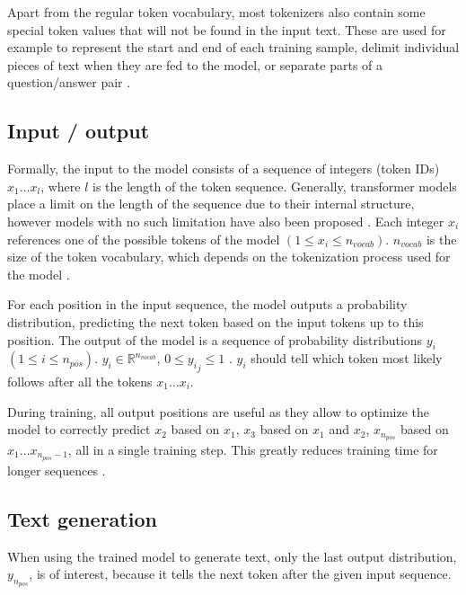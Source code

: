 Apart from the regular token vocabulary, most tokenizers also contain some special token values that will not be found in the input text. These are used for example to represent the start and end of each training sample, delimit individual pieces of text when they are fed to the model, or separate parts of a question/answer pair \cite{HuggingFaceTokenizers}.


\subsection{Input / output}

Formally, the input to the model consists of a sequence of integers (token IDs) $x_1 \ldots x_l$, where $l$ is the length of the token sequence.
Generally, transformer models place a limit on the length of the sequence due to their internal structure, however models with no such limitation have also been proposed \cite{su2023roformer}.
Each integer $x_i$ references one of the possible tokens of the model $(1 \leq x_i \leq n_{vocab})$. $n_{vocab}$ is the size of the token vocabulary, which depends on the tokenization process used for the model .

\label{transformer:output}

For each position in the input sequence, the model outputs a probability distribution, predicting the next token based on the input tokens up to this position. 
The output of the model is a sequence of probability distributions $y_i$ $(1 \leq i \leq n_{pos})$. $y_i \in \mathbb{R}^{n_{vocab}}$, $0 \leq {y_i}_j \leq 1$  \cite{HuggingFaceGPT2}.
$y_i$ should tell which token most likely follows after all the tokens $x_1 \ldots x_i$.

During training, all output positions are useful as they allow to optimize the model to correctly predict $x_2$ based on $x_1$,
$x_3$ based on $x_1$ and $x_2$, $x_{n_{pos}}$ based on $x_1 \ldots x_{n_{pos}-1}$, all in a single training step. This greatly reduces training time for longer sequences \cite{alammar-gpt2}.

\subsection{Text generation}

When using the trained model to generate text, only the last output distribution, $y_{n_{pos}}$, is of interest, because
it tells the next token after the given input sequence. \cite{Mao2021Autoregressive}

